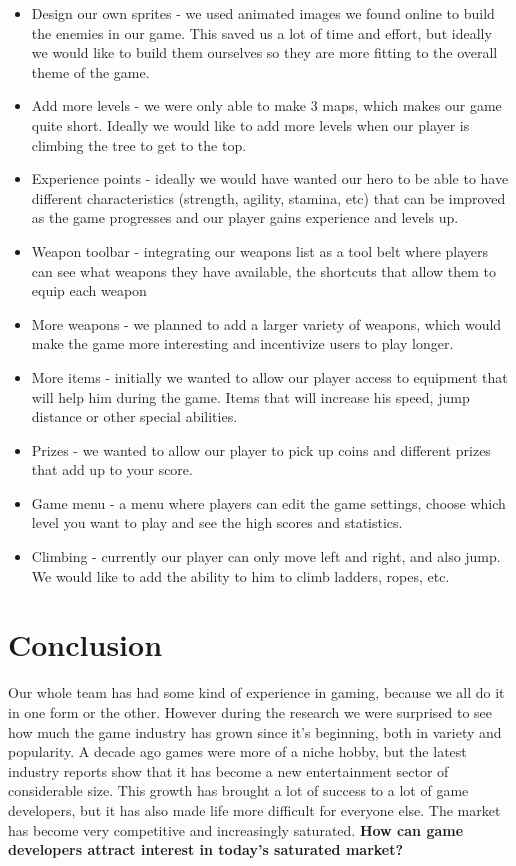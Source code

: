 \documentclass[12p]{article}
\begin{document}
\begin{itemize}
    \item Design our own sprites - we used animated images we found online to build the enemies in our game. This saved us a lot of time and effort, but ideally we would like to build them ourselves so they are more fitting to the overall theme of the game.
    \item Add more levels - we were only able to make 3 maps, which makes our game quite short. Ideally we would like to add more levels when our player is climbing the tree to get to the top.
    \item Experience points - ideally we would have wanted our hero to be able to have different characteristics (strength, agility, stamina, etc) that can be improved as the game progresses and our player gains experience and levels up.
    \item Weapon toolbar - integrating our weapons list as a tool belt where players can see what weapons they have available, the shortcuts that allow them to equip each weapon 
    \item More weapons - we planned to add a larger variety of weapons, which would make the game more interesting and incentivize users to play longer.
    \item More items - initially we wanted to allow our player access to equipment that will help him during the game. Items that will increase his speed, jump distance or other special abilities.
    \item Prizes - we wanted to allow our player to pick up coins and different prizes that add up to your score.
    \item Game menu - a menu where players can edit the game settings, choose which level you want to play and see the high scores and statistics.
    \item Climbing - currently our player can only move left and right, and also jump. We would like to add the ability to him to climb ladders, ropes, etc.
\end{itemize}


\newpage
\section{Conclusion}
Our whole team has had some kind of experience in gaming, because we all do it in one form or the other. However during the research we were surprised to see how much the game industry has grown since it's beginning, both in variety and popularity. A decade ago games were more of a niche hobby, but the latest industry reports show that it has become a new entertainment sector of considerable size.
This growth has brought a lot of success to a lot of game developers, but it has also made life more difficult for everyone else. The market has become very competitive and increasingly saturated.
\textbf{How can game developers attract interest in today’s saturated market?}
\end{document}
